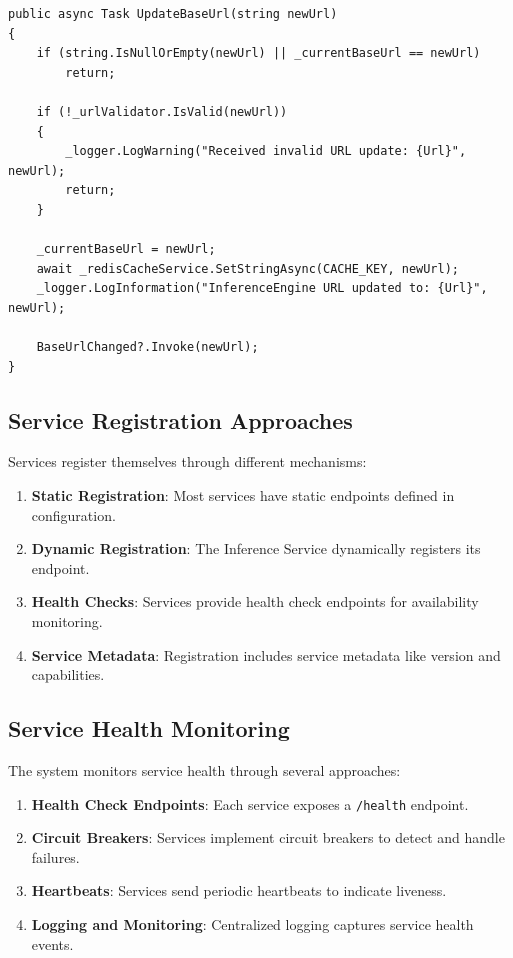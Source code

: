\begin{verbatim}
public async Task UpdateBaseUrl(string newUrl)
{
    if (string.IsNullOrEmpty(newUrl) || _currentBaseUrl == newUrl)
        return;
        
    if (!_urlValidator.IsValid(newUrl))
    {
        _logger.LogWarning("Received invalid URL update: {Url}", newUrl);
        return;
    }
    
    _currentBaseUrl = newUrl;
    await _redisCacheService.SetStringAsync(CACHE_KEY, newUrl);
    _logger.LogInformation("InferenceEngine URL updated to: {Url}", newUrl);
    
    BaseUrlChanged?.Invoke(newUrl);
}
\end{verbatim}

\subsection{Service Registration Approaches}

Services register themselves through different mechanisms:

\begin{enumerate}
   \item \textbf{Static Registration}: Most services have static endpoints defined in configuration.
   \item \textbf{Dynamic Registration}: The Inference Service dynamically registers its endpoint.
   \item \textbf{Health Checks}: Services provide health check endpoints for availability monitoring.
   \item \textbf{Service Metadata}: Registration includes service metadata like version and capabilities.
\end{enumerate}

\subsection{Service Health Monitoring}

The system monitors service health through several approaches:

\begin{enumerate}
   \item \textbf{Health Check Endpoints}: Each service exposes a \texttt{/health} endpoint.
   \item \textbf{Circuit Breakers}: Services implement circuit breakers to detect and handle failures.
   \item \textbf{Heartbeats}: Services send periodic heartbeats to indicate liveness.
   \item \textbf{Logging and Monitoring}: Centralized logging captures service health events.
\end{enumerate}

